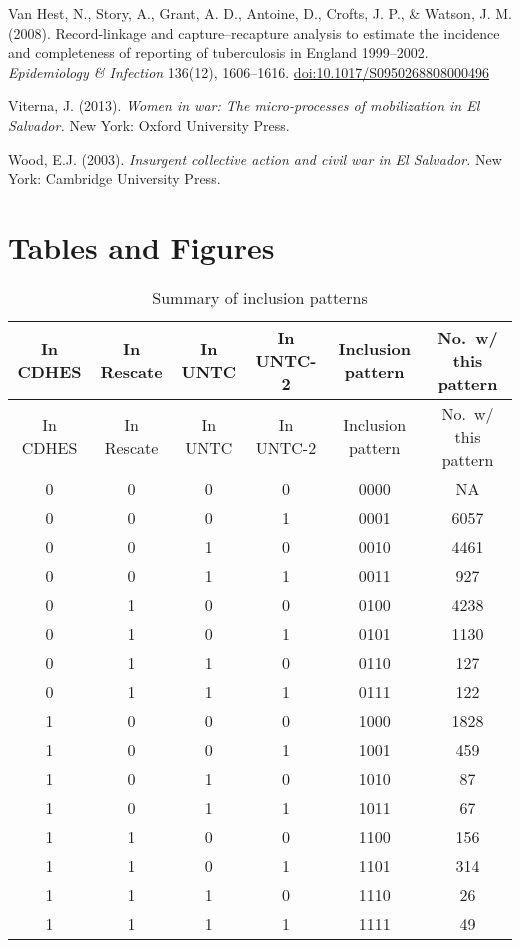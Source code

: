 \documentclass[11pt,]{article}
\begin{document}
Van Hest, N., Story, A., Grant, A. D., Antoine, D., Crofts, J. P., \&
Watson, J. M. (2008). Record-linkage and capture--recapture analysis to
estimate the incidence and completeness of reporting of tuberculosis in
England 1999--2002. \emph{Epidemiology \& Infection} 136(12),
1606--1616. \url{doi:10.1017/S0950268808000496}

Viterna, J. (2013). \emph{Women in war: The micro-processes of
mobilization in El Salvador.} New York: Oxford University Press.

Wood, E.J. (2003). \emph{Insurgent collective action and civil war in El
Salvador.} New York: Cambridge University Press.

\pagebreak

\hypertarget{tables-and-figures}{%
\section{Tables and Figures}\label{tables-and-figures}}

\scriptsize

\begin{longtable}[]{@{}cccccc@{}}
\caption{Summary of inclusion patterns}\tabularnewline
\toprule
In CDHES & In Rescate & In UNTC & In UNTC-2 & Inclusion pattern & No.~w/
this pattern\tabularnewline
\midrule
\endfirsthead
\toprule
In CDHES & In Rescate & In UNTC & In UNTC-2 & Inclusion pattern & No.~w/
this pattern\tabularnewline
\midrule
\endhead
0 & 0 & 0 & 0 & 0000 & NA\tabularnewline
0 & 0 & 0 & 1 & 0001 & 6057\tabularnewline
0 & 0 & 1 & 0 & 0010 & 4461\tabularnewline
0 & 0 & 1 & 1 & 0011 & 927\tabularnewline
0 & 1 & 0 & 0 & 0100 & 4238\tabularnewline
0 & 1 & 0 & 1 & 0101 & 1130\tabularnewline
0 & 1 & 1 & 0 & 0110 & 127\tabularnewline
0 & 1 & 1 & 1 & 0111 & 122\tabularnewline
1 & 0 & 0 & 0 & 1000 & 1828\tabularnewline
1 & 0 & 0 & 1 & 1001 & 459\tabularnewline
1 & 0 & 1 & 0 & 1010 & 87\tabularnewline
1 & 0 & 1 & 1 & 1011 & 67\tabularnewline
1 & 1 & 0 & 0 & 1100 & 156\tabularnewline
1 & 1 & 0 & 1 & 1101 & 314\tabularnewline
1 & 1 & 1 & 0 & 1110 & 26\tabularnewline
1 & 1 & 1 & 1 & 1111 & 49\tabularnewline
\bottomrule
\end{longtable}

\pagebreak
\end{document}
